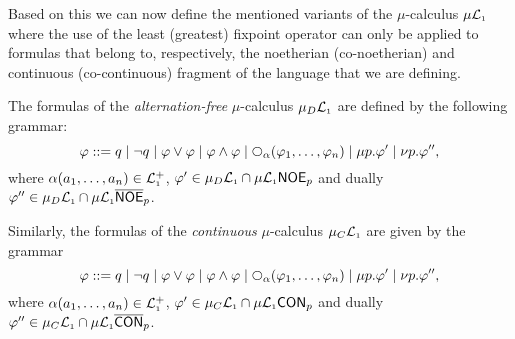 Based on this we can now define the mentioned variants 
of the $\mu$-calculus $\mu\mathcal{L}_{\scriptscriptstyle 1}$ where the use of the least (greatest) 
fixpoint operator can only be applied to formulas that belong to, 
respectively, the noetherian (co-noetherian) and continuous (co-continuous)
fragment of the language that we are defining.

\begin{definition}
The formulas of the \emph{alternation-free} $\mu$-calculus $\mu_{D}\mathcal{L}_{\scriptscriptstyle 1}$ 
are defined by the following grammar:
\begin{equation*}
   \varphi ::= 
      q \mid \neg q 
   \mid \varphi\lor\varphi \mid \varphi\land\varphi 
   \mid \nxt{\al}(\varphi_{1},\ldots,\varphi_{n})
   \mid \mu p. \varphi'    
   \mid \nu p. \varphi'',
\end{equation*} 
where $\alpha(a_{1},\ldots,a_{n}) \in \mathcal{L}_{\scriptscriptstyle 1}^{+}$,
$\varphi' \in \mu_{D}\mathcal{L}_{\scriptscriptstyle 1} \cap \mu\mathcal{L}_{\scriptscriptstyle 1}\mathsf{NOE}_{p}$
and dually $\varphi'' \in \mu_{D}\mathcal{L}_{\scriptscriptstyle 1} \cap \mu\mathcal{L}_{\scriptscriptstyle 1}\overline{\mathsf{NOE}}_{p}$.

Similarly, the formulas of the \emph{continuous} $\mu$-calculus $\mu_{C}\mathcal{L}_{\scriptscriptstyle 1}$
are given by the grammar
\begin{equation*}
   \varphi ::= 
      q \mid \neg q 
   \mid \varphi\lor\varphi \mid \varphi\land\varphi 
   \mid \nxt{\al}(\varphi_{1},\ldots,\varphi_{n})
   \mid \mu p. \varphi'    
   \mid \nu p. \varphi'',
\end{equation*} 
where $\alpha(a_{1},\ldots,a_{n}) \in \mathcal{L}_{\scriptscriptstyle 1}^{+}$,
$\varphi' \in \mu_{C}\mathcal{L}_{\scriptscriptstyle 1} \cap \mu\mathcal{L}_{\scriptscriptstyle 1}\mathsf{CON}_{p}$
and dually $\varphi'' \in \mu_{C}\mathcal{L}_{\scriptscriptstyle 1} \cap \mu\mathcal{L}_{\scriptscriptstyle 1}\overline{\mathsf{CON}}_{p}$.
\end{definition}


